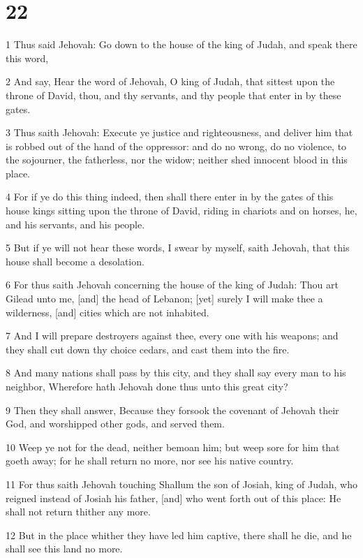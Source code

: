 \chapter{22}

\par 1 Thus said Jehovah: Go down to the house of the king of Judah, and speak there this word,
\par 2 And say, Hear the word of Jehovah, O king of Judah, that sittest upon the throne of David, thou, and thy servants, and thy people that enter in by these gates.
\par 3 Thus saith Jehovah: Execute ye justice and righteousness, and deliver him that is robbed out of the hand of the oppressor: and do no wrong, do no violence, to the sojourner, the fatherless, nor the widow; neither shed innocent blood in this place.
\par 4 For if ye do this thing indeed, then shall there enter in by the gates of this house kings sitting upon the throne of David, riding in chariots and on horses, he, and his servants, and his people.
\par 5 But if ye will not hear these words, I swear by myself, saith Jehovah, that this house shall become a desolation.
\par 6 For thus saith Jehovah concerning the house of the king of Judah: Thou art Gilead unto me, [and] the head of Lebanon; [yet] surely I will make thee a wilderness, [and] cities which are not inhabited.
\par 7 And I will prepare destroyers against thee, every one with his weapons; and they shall cut down thy choice cedars, and cast them into the fire.
\par 8 And many nations shall pass by this city, and they shall say every man to his neighbor, Wherefore hath Jehovah done thus unto this great city?
\par 9 Then they shall answer, Because they forsook the covenant of Jehovah their God, and worshipped other gods, and served them.
\par 10 Weep ye not for the dead, neither bemoan him; but weep sore for him that goeth away; for he shall return no more, nor see his native country.
\par 11 For thus saith Jehovah touching Shallum the son of Josiah, king of Judah, who reigned instead of Josiah his father, [and] who went forth out of this place: He shall not return thither any more.
\par 12 But in the place whither they have led him captive, there shall he die, and he shall see this land no more.
